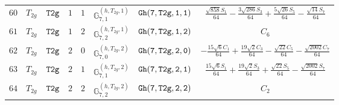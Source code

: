 \documentclass[fleqn,8pt]{jsarticle}
\begin{document}
\begin{table}[ht!]
\begin{center}
\begin{tabular}{cccccccc}
$ 60 $ & $ T_{2g} $ & $ {\tt T2g} $ & $ 1 $ & $ 1 $ & $ \mathbb{G}_{7,1}^{(h,T_{2g},1)} $ & $ {\tt Gh(7,T2g,1,1)} $ & $ \frac{\sqrt{858} S_{1}}{64} - \frac{3 \sqrt{286} S_{3}}{64} + \frac{5 \sqrt{26} S_{5}}{64} - \frac{\sqrt{14} S_{7}}{64} $ \\
$ 61 $ & $ T_{2g} $ & $ {\tt T2g} $ & $ 1 $ & $ 2 $ & $ \mathbb{G}_{7,2}^{(h,T_{2g},1)} $ & $ {\tt Gh(7,T2g,1,2)} $ & $ C_{6} $ \\
$ 62 $ & $ T_{2g} $ & $ {\tt T2g} $ & $ 2 $ & $ 0 $ & $ \mathbb{G}_{7,0}^{(h,T_{2g},2)} $ & $ {\tt Gh(7,T2g,2,0)} $ & $ - \frac{15 \sqrt{6} C_{1}}{64} + \frac{19 \sqrt{2} C_{3}}{64} - \frac{\sqrt{22} C_{5}}{64} - \frac{\sqrt{2002} C_{7}}{64} $ \\
$ 63 $ & $ T_{2g} $ & $ {\tt T2g} $ & $ 2 $ & $ 1 $ & $ \mathbb{G}_{7,1}^{(h,T_{2g},2)} $ & $ {\tt Gh(7,T2g,2,1)} $ & $ \frac{15 \sqrt{6} S_{1}}{64} + \frac{19 \sqrt{2} S_{3}}{64} + \frac{\sqrt{22} S_{5}}{64} - \frac{\sqrt{2002} S_{7}}{64} $ \\
$ 64 $ & $ T_{2g} $ & $ {\tt T2g} $ & $ 2 $ & $ 2 $ & $ \mathbb{G}_{7,2}^{(h,T_{2g},2)} $ & $ {\tt Gh(7,T2g,2,2)} $ & $ C_{2} $ \\
 \hline \hline
\end{tabular}
\end{center}
\end{table}
\end{document}
